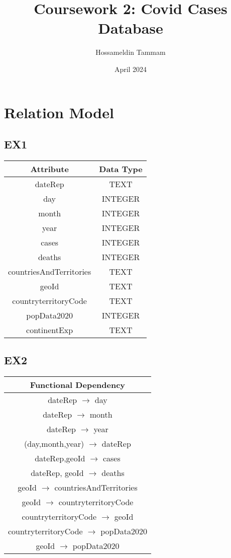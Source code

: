 \documentclass{article}
\title{Coursework 2: Covid Cases Database}
\author{Hossameldin Tammam}
\date{April 2024}
\begin{document}
\maketitle

\section{Relation Model}
\subsection{EX1}

\begin{tabular}{|c|c|}
 \hline
 Attribute & Data Type \\
 \hline
 dateRep & TEXT\\
 \hline
 day & INTEGER\\
 \hline
 month & INTEGER\\
 \hline
 year & INTEGER\\
 \hline
 cases & INTEGER\\
 \hline
 deaths & INTEGER\\
 \hline
 countriesAndTerritories & TEXT\\
 \hline
 geoId & TEXT\\
 \hline
 countryterritoryCode & TEXT\\
 \hline
 popData2020 & INTEGER\\
 \hline
 continentExp & TEXT\\
 \hline
\end{tabular}

\subsection{EX2}    
\begin{tabular}[t]{|c|}
  \hline
  \textbf{Functional Dependency} \\
  \hline
  dateRep $\to$ day\\ 
  dateRep $\to$ month\\ 
  dateRep $\to$ year\\
  (day,month,year) $\to$ dateRep \\
  dateRep,geoId $\to$ cases\\ 
  dateRep, geoId $\to$ deaths \\ 
  geoId $\to$ countriesAndTerritories\\ 
  geoId $\to$ countryterritoryCode\\ 
  countryterritoryCode $\to$ geoId\\ 
  countryterritoryCode $\to$ popData2020\\ 
  geoId $\to$ popData2020\\ 
  \hline
\end{tabular}
\end{document}
